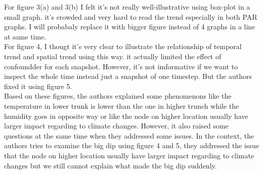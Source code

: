 \documentclass{article}\usepackage[]{graphicx}\usepackage[]{color}
\begin{document}
For figure 3(a) and 3(b) I felt it's not really well-illustrative using box-plot in a small graph. it's crowded and very hard to read the trend especially in both PAR graphs. I will probabaly replace it with bigger figure instead of 4 graphs in a line at same time. \\

For figure 4, I thougt it's very clear to illustrate the relationship of temporal trend and spatial trend using this way. it actually limited the effect of confoundder for each snapshot. However, it's not imformative if we want to inspect the whole time instead just a snapshot of one timestep. But the authors fixed it using figure 5.\\

Based on these figures, the authors explained some phenomenons like the temperature in lower trunk is lower than the one in higher trunch while the humidity goes in opposite way or like the node on higher location usually have larger impact regarding to climate changes. However, it also raised some questions at the same time when they addressed some issues. In the context, the authors tries to examine the big dip using figure 4 and 5, they addressed the issue that the node on higher location usually have larger impact regarding to climate changes but we still cannot explain what made the big dip suddenly.
\end{document}
